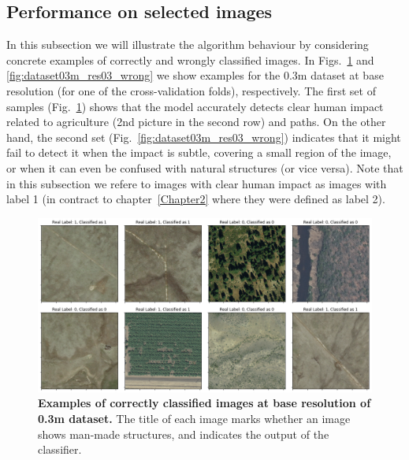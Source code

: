 \subsection{Performance on selected images}
In this subsection we will illustrate the algorithm behaviour by considering concrete examples of correctly and wrongly classified images. In Figs.~\ref{fig:dataset03m_res03_correct} and \ref{fig:dataset03m_res03_wrong} we show examples for the 0.3m dataset at base resolution (for one of the cross-validation folds), respectively.
The first set of samples (Fig.~\ref{fig:dataset03m_res03_correct}) shows that the model accurately detects clear human impact related to agriculture (2nd picture in the second row) and paths. On the other hand, the second set (Fig.~\ref{fig:dataset03m_res03_wrong}) indicates that it might fail to detect it when the impact is subtle, covering a small region of the image, or when it can even be confused with natural structures (or vice versa). Note that in this subsection we refere to images with clear human impact as images with label 1 (in contract to chapter~\ref{Chapter2} where they were defined as label 2).

\begin{figure}[H]
	\centering
	\captionsetup{width=1\linewidth}
	\includegraphics[width=1\textwidth]{Figures/results/class_dataset03m_res03_correct.png}
	\caption{\textbf{Examples of correctly classified images at base resolution of 0.3m dataset.} The title of each image marks whether an image shows man-made structures, and indicates the output of the classifier.}
	\label{fig:dataset03m_res03_correct}
\end{figure}

